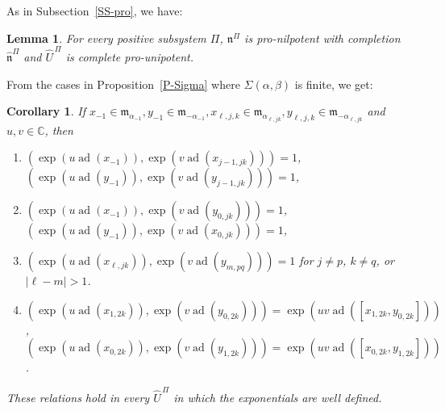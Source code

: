 \documentclass[11pt,letterpaper]{amsart}
\newcounter{thecounter}
\numberwithin{thecounter}{section}
\newtheorem{lemma}[thecounter]{Lemma}
\newtheorem{corollary}[thecounter]{Corollary}
\theoremstyle{definition}
\DeclareMathOperator{\ad}{ad}
\renewcommand{\a}{\alpha}
\renewcommand{\b}{\beta}
\newcommand{\C}{{\mathbb C}}
\newcommand{\UhPi}{{\widehat{U}^{\,\Pi}}}
\newcommand{\m}{{\mathfrak{m}}}
\newcommand{\nh}{\widehat{\mathfrak{n}}}
\begin{document}
As in Subsection~\ref{SS-pro}, we have:
\begin{lemma}
For every positive subsystem $\Pi$,
$\mathfrak{n}^{\Pi}$ is pro-nilpotent with completion $\nh^{\Pi}$ and
$\UhPi$ is complete pro-unipotent.
\end{lemma}


From the cases in Proposition~\ref{P-Sigma} where $\Sigma(\a,\b)$ is finite, we get:
\begin{corollary}
If $x_{-1}\in \m_{\a_{-1}}, y_{-1}\in \m_{-\a_{-1}}, x_{\ell,j,k}\in\m_{\a_{\ell,jk}}, y_{\ell,j,k}\in\m_{-\a_{\ell,jk}}$ 
and $u,v\in\C$, then
\begin{enumerate}
\item $\left(\exp\left(u\ad\left(x_{-1}\right)\right),\exp\left(v\ad\left(x_{j-1,jk}\right)\right)\right) 
          =1$,\\ $\left(\exp\left(u\ad\left(y_{-1}\right)\right),\exp\left(v\ad\left(y_{j-1,jk}\right)\right)\right) = 1$,
\item $\left(\exp\left(u\ad\left(x_{-1}\right)\right),\exp\left(v\ad\left(y_{0,jk}\right)\right)\right)=1$,\\ 
           $\left(\exp\left(u\ad\left(y_{-1}\right)\right),\exp\left(v\ad\left(x_{0,jk}\right)\right)\right) =1$,
\item $\left(\exp\left(u\ad\left(x_{\ell,jk}\right)\right),\exp\left(v\ad\left(y_{m,pq}\right)\right)\right) =1$
         for $j\ne p$, $k\ne q$, or $|\ell-m|>1$.
\item $\left(\exp\left(u\ad\left(x_{1,2k}\right)\right),\exp\left(v\ad\left(y_{0,2k}\right)\right)\right) =\exp\left(uv\ad\left([x_{1,2k},y_{0,2k}]\right)\right)$,\\
         $\left(\exp\left(u\ad\left(x_{0,2k}\right)\right),\exp\left(v\ad\left(y_{1,2k}\right)\right)\right) =\exp\left(uv\ad\left([x_{0,2k},y_{1,2k}]\right)\right)$.
\end{enumerate}
These relations hold in every $\UhPi$ in which the exponentials are well defined.
\end{corollary}
\end{document}
